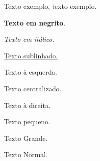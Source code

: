 \documentclass[12pt]{article}
\begin{document}
	
	Texto exemplo, texto exemplo.
	
	\textbf{Texto em negrito}.
	
	\textit{Texto em itálico.}
	
	\underline{Texto sublinhado.}
	
	\begin{flushleft}
			Texto à esquerda.
	\end{flushleft}

	\begin{center}
		Texto centralizado.
	\end{center}
	
	\begin{flushright}
		Texto à direita.
	\end{flushright}
	
	{\tiny Texto pequeno.}
	
	{\Huge Texto Grande.}
	
	Texto Normal.
	
	
	


	
\end{document}
